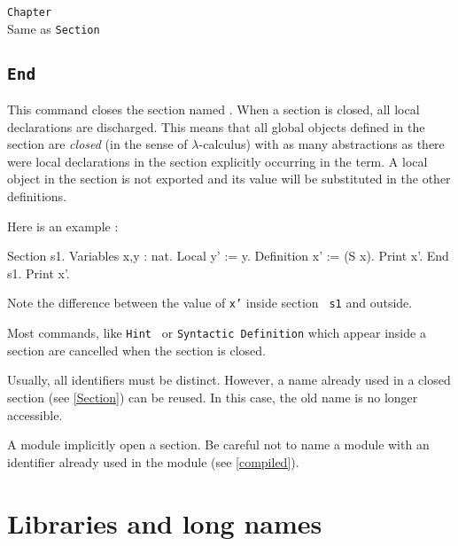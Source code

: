 {\begin{coq_example}
\begin{Variants}
\item{\tt Chapter {\ident}}\\
        Same as {\tt Section {\ident}}
\end{Variants}

\subsection{\tt End {\ident}}
This command closes the section named {\ident}. When a section is
closed, all local declarations are discharged. This means that all
global objects defined in the section are {\it closed} (in the sense
of $\lambda$-calculus) with as many abstractions as there were local
declarations in the section explicitly occurring in the term.  A local
object in the section is not exported and its value will be
substituted in the other definitions.

Here is an example :
\begin{coq_example}
Section s1.
Variables x,y : nat.
Local y' := y.
Definition x' := (S x).
Print x'.
End s1.
Print x'.
\end{coq_example}
Note the difference between the value of {\tt x'} inside section {\tt
  s1} and outside.

\begin{ErrMsgs}
\item {}
\item {}
\end{ErrMsgs}

\begin{Remarks}
\item Most commands, like {\tt Hint \ident} or {\tt Syntactic
  Definition} which appear inside a section are cancelled when the
section is closed.
\item Usually, all identifiers must be distinct. 
However, a name already used in a closed section (see \ref{Section})
can be reused. In this case, the old name is no longer accessible.
\item A module implicitly open a section. Be careful not to name a
module with an identifier already used in the module (see \ref{compiled}).
\end{Remarks}

\section{Libraries and long names}


\end{coq_example}}
